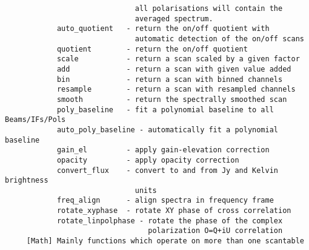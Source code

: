 \documentclass[11pt]{article}
\begin{document}
\begin{verbatim}
                              all polarisations will contain the
                              averaged spectrum.
            auto_quotient   - return the on/off quotient with
                              automatic detection of the on/off scans
            quotient        - return the on/off quotient
            scale           - return a scan scaled by a given factor
            add             - return a scan with given value added
            bin             - return a scan with binned channels
            resample        - return a scan with resampled channels
            smooth          - return the spectrally smoothed scan
            poly_baseline   - fit a polynomial baseline to all Beams/IFs/Pols
            auto_poly_baseline - automatically fit a polynomial baseline
            gain_el         - apply gain-elevation correction
            opacity         - apply opacity correction
            convert_flux    - convert to and from Jy and Kelvin brightness
                              units
            freq_align      - align spectra in frequency frame
            rotate_xyphase  - rotate XY phase of cross correlation
            rotate_linpolphase - rotate the phase of the complex
                                 polarization O=Q+iU correlation
     [Math] Mainly functions which operate on more than one scantable


\end{verbatim}
\end{document}
